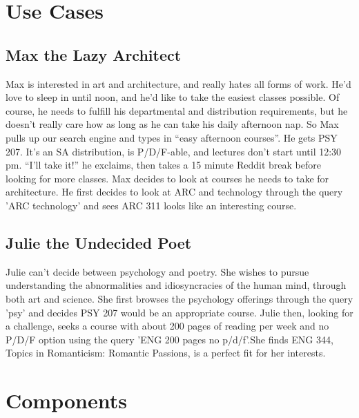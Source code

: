 \documentclass[12pt,letterpaper]{article}
\begin{document}
\section{Use Cases}
\subsection{Max the Lazy Architect}
Max is interested in art and architecture, and really hates all forms of work. He'd love to sleep in until noon, and he'd like to take the easiest classes possible. Of course, he needs to fulfill his departmental and distribution requirements, but he doesn't really care how as long as he can take his daily afternoon nap. So Max pulls up our search engine and types in ``easy afternoon courses''. He gets PSY 207. It's an SA distribution, is P/D/F-able, and lectures don't start until 12:30 pm. ``I'll take it!'' he exclaims, then takes a 15 minute Reddit break before looking for more classes. Max decides to look at courses he needs to take for architecture. He first decides to look at ARC and technology through the query 'ARC technology' and sees ARC 311 looks like an interesting course.
		
\subsection{Julie the Undecided Poet}
Julie can't decide between psychology and poetry. She wishes to pursue understanding the abnormalities and idiosyncracies of the human mind, through both art and science. She first browses the psychology offerings through the query 'psy' and decides PSY 207 would be an appropriate course. Julie then, looking for a challenge, seeks a course with about 200 pages of reading per week and no P/D/F option using the query 'ENG 200 pages no p/d/f'.She finds ENG 344, Topics in Romanticism: Romantic Passions, is a perfect fit for her interests.  

\section{Components}
\end{document}
